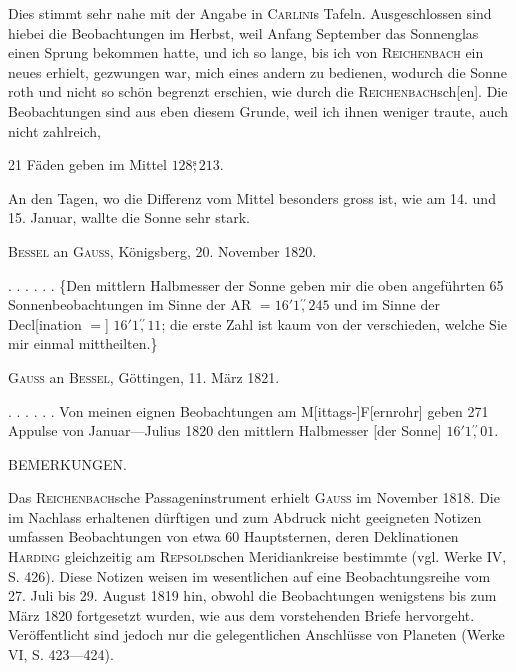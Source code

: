 \clearpage{}
\noindent Dies stimmt sehr nahe mit der Angabe in \textsc{Carlini}s Tafeln. Ausgeschlossen sind hiebei die Beobachtungen im Herbst, weil Anfang September das Sonnenglas einen Sprung bekommen hatte, und ich so lange, bis ich von \textsc{Reichenbach} ein neues erhielt, gezwungen war, mich eines andern zu bedienen, wodurch die Sonne roth und nicht so schön begrenzt erschien, wie durch die \textsc{Reichenbach}sch[en]. Die Beobachtungen sind aus eben diesem Grunde, weil ich ihnen weniger traute, auch nicht zahlreich,
\begin{center}21 Fäden geben im Mittel \(128\overset{\mathrm{s}}{,}213\).\end{center}
\noindent An den Tagen, wo die Differenz vom Mittel besonders gross ist, wie am 14. und 15. Januar, wallte die Sonne sehr stark.

\begin{center}\textsc{Bessel} an \textsc{Gauss}, Königsberg, 20. November 1820.\end{center}
\noindent\hspace*{\parindent}. . . . . . \{Den mittlern Halbmesser der Sonne geben mir die oben angeführten 65 Sonnenbeobachtungen im Sinne der AR \(=16'1\overset{\prime\prime}{,}245\) und im Sinne der Decl[ination \(=\)] \(16'1\overset{\prime\prime}{,}11\); die erste Zahl ist kaum von der verschieden, welche Sie mir einmal mittheilten.\}

\begin{center}\textsc{Gauss} an \textsc{Bessel}, Göttingen, 11. März 1821.\end{center}
\noindent\hspace*{\parindent}. . . . . . Von meinen eignen Beobachtungen am M[ittags-]F[ernrohr] geben 271 Appulse von Januar—Julius 1820 den mittlern Halbmesser [der Sonne] \(16'1\overset{\prime\prime}{,}01\).

\begin{center}BEMERKUNGEN.\end{center}
\begingroup\small
\noindent\hspace*{\parindent}Das \textsc{Reichenbach}sche Passageninstrument erhielt \textsc{Gauss} im November 1818. Die im Nachlass erhaltenen dürftigen und zum Abdruck nicht geeigneten Notizen umfassen Beobachtungen von etwa 60 Hauptsternen, deren Deklinationen \textsc{Harding} gleichzeitig am \textsc{Repsold}schen Meridiankreise bestimmte (vgl. Werke IV, S. 426). Diese Notizen weisen im wesentlichen auf eine Beobachtungsreihe vom 27. Juli bis 29. August 1819 hin, obwohl die Beobachtungen wenigstens bis zum März 1820 fortgesetzt wurden, wie aus dem vorstehenden Briefe hervorgeht. Veröffentlicht sind jedoch nur die gelegentlichen Anschlüsse von Planeten (Werke VI, S. 423—424).

